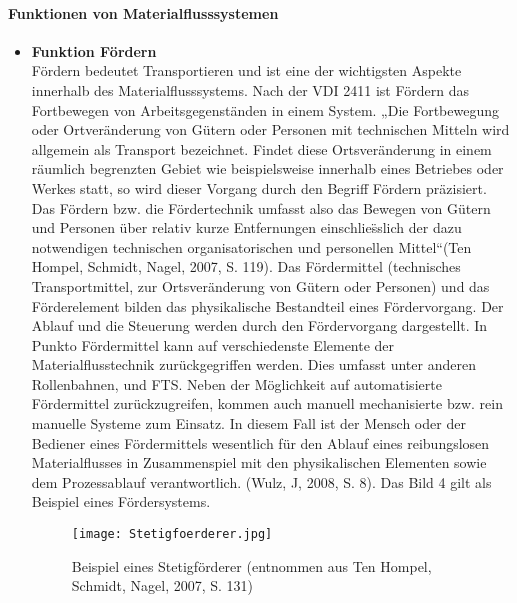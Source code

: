 \paragraph{Funktionen von Materialflusssystemen}
\begin{itemize}
	\item \textbf{Funktion F\"ordern} \\
	F\"ordern bedeutet Transportieren und ist eine der wichtigsten Aspekte innerhalb des Materialflusssystems. Nach der VDI 2411 ist F\"ordern das Fortbewegen von Arbeitsgegenst\"anden in einem System. „Die Fortbewegung oder Ortver\"anderung von G\"utern oder Personen mit technischen Mitteln wird allgemein als Transport bezeichnet. Findet diese Ortsver\"anderung in einem r\"aumlich begrenzten Gebiet wie beispielsweise innerhalb eines Betriebes oder Werkes statt, so wird dieser Vorgang durch den Begriff F\"ordern pr\"azisiert. Das F\"ordern bzw. die F\"ordertechnik umfasst also das Bewegen von G\"utern und Personen \"uber relativ kurze Entfernungen einschlie\"sslich der dazu notwendigen technischen organisatorischen und personellen Mittel“(Ten Hompel, Schmidt, Nagel, 2007, S. 119). 
Das F\"ordermittel (technisches Transportmittel, zur Ortsver\"anderung von G\"utern oder Personen) und das F\"orderelement bilden das physikalische Bestandteil eines F\"ordervorgang. Der Ablauf und die Steuerung werden durch den F\"ordervorgang dargestellt. In Punkto F\"ordermittel kann auf verschiedenste Elemente der Materialflusstechnik zur\"uckgegriffen werden. Dies umfasst unter anderen Rollenbahnen, und FTS. Neben der M\"oglichkeit auf automatisierte F\"ordermittel zur\"uckzugreifen, kommen auch manuell mechanisierte bzw. rein manuelle Systeme zum Einsatz. In diesem Fall ist der Mensch oder der Bediener eines F\"ordermittels wesentlich f\"ur den Ablauf eines reibungslosen Materialflusses in Zusammenspiel mit den physikalischen Elementen sowie dem Prozessablauf verantwortlich. (Wulz, J, 2008, S. 8). Das Bild 4 gilt als Beispiel eines F\"ordersystems. 
	\begin{figure}[h!]
	\centering
  \texttt{[image: Stetigfoerderer.jpg]}
	\caption{Beispiel eines Stetigf\"orderer (entnommen aus Ten Hompel, Schmidt, Nagel, 2007, S. 131)}
	\label{Stetigfoerderer}
\end{figure}


\end{itemize}
